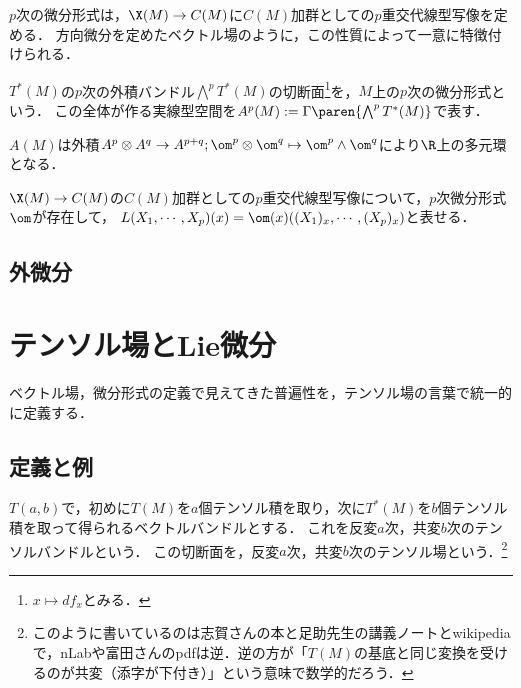 \documentclass[uplatex,dvipdfmx]{jsreport}
\begin{document}
\begin{tcolorbox}[colframe=ForestGreen, colback=ForestGreen!10!white,breakable,colbacktitle=ForestGreen!40!white,coltitle=black,fonttitle=\bfseries\sffamily,
title=]
    $p$次の微分形式は，$\X(M)\to C(M)$に$C(M)$加群としての$p$重交代線型写像を定める．
    方向微分を定めたベクトル場のように，この性質によって一意に特徴付けられる．
\end{tcolorbox}

\begin{definition}
    $T^*(M)$の$p$次の外積バンドル$\bigwedge^pT^*(M)$の切断面\footnote{$x\mapsto df_x$とみる．}を，$M$上の$p$次の微分形式という．
    この全体が作る実線型空間を$A^p(M):=\Gamma\paren{\bigwedge^pT^*(M)}$で表す．
\end{definition}
\begin{remark}
    $A(M)$は外積$A^p\otimes A^q\to A^{p+q};\om^p\otimes\om^q\mapsto\om^p\wedge\om^q$により$\R$上の多元環となる．
\end{remark}

\begin{theorem}
    $\X(M)\to C(M)$の$C(M)$加群としての$p$重交代線型写像について，$p$次微分形式$\om$が存在して，
    $L(X_1,\cdots,X_p)(x)=\om(x)((X_1)_x,\cdots,(X_p)_x)$と表せる．
\end{theorem}

\subsection{外微分}

\section{テンソル場とLie微分}

\begin{tcolorbox}[colframe=ForestGreen, colback=ForestGreen!10!white,breakable,colbacktitle=ForestGreen!40!white,coltitle=black,fonttitle=\bfseries\sffamily,
title=]
    ベクトル場，微分形式の定義で見えてきた普遍性を，テンソル場の言葉で統一的に定義する．
\end{tcolorbox}

\subsection{定義と例}

\begin{notation}
    $T(a,b)$で，初めに$T(M)$を$a$個テンソル積を取り，次に$T^*(M)$を$b$個テンソル積を取って得られるベクトルバンドルとする．
    これを反変$a$次，共変$b$次のテンソルバンドルという．
    この切断面を，反変$a$次，共変$b$次のテンソル場という．\footnote{このように書いているのは志賀さんの本と足助先生の講義ノートとwikipediaで，nLabや富田さんのpdfは逆．逆の方が「$T(M)$の基底と同じ変換を受けるのが共変（添字が下付き）」という意味で数学的だろう．}
\end{notation}
\end{document}
